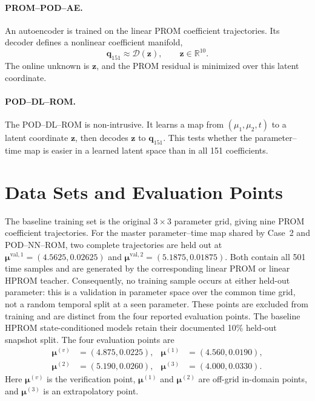 \documentclass[11pt]{article}
\newcommand{\q}{\mathbf q}
\newcommand{\mub}{\bm\mu}
\newcommand{\z}{\mathbf z}
\begin{document}
\paragraph{PROM--POD--AE.}
An autoencoder is trained on the linear PROM coefficient trajectories.  Its decoder defines a nonlinear coefficient
manifold,
\begin{equation}
  \q_{151}\approx\mathcal D(\z), \qquad \z\in\mathbb R^{10}.
  \label{eq:podae}
\end{equation}
The online unknown is \(\z\), and the PROM residual is minimized over this latent coordinate.

\paragraph{POD--DL--ROM.}
The POD--DL--ROM is non-intrusive.  It learns a map from \((\mu_1,\mu_2,t)\) to a latent coordinate \(\z\), then
decodes \(\z\) to \(\q_{151}\).  This tests whether the parameter--time map is easier in a learned latent space
than in all 151 coefficients.

\section{Data Sets and Evaluation Points}
The baseline training set is the original \(3\times3\) parameter grid, giving nine PROM coefficient trajectories.
For the master parameter--time map shared by Case~2 and POD--NN--ROM, two complete trajectories are held out at
\(\mub^{\mathrm{val},1}=(4.5625,0.02625)\) and
\(\mub^{\mathrm{val},2}=(5.1875,0.01875)\).  Both contain all 501 time samples and are generated by the
corresponding linear PROM or linear HPROM teacher.  Consequently, no training sample occurs at either held-out
parameter: this is a validation in parameter space over the common time grid, not a random temporal split at a
seen parameter.  These points are excluded from training and are distinct from the four reported evaluation points.
The baseline HPROM state-conditioned models retain their documented 10\% held-out snapshot split.  The four
evaluation points are
\begin{align*}
  \mub^{(v)} &= (4.875,0.0225), &
  \mub^{(1)} &= (4.560,0.0190),\\
  \mub^{(2)} &= (5.190,0.0260), &
  \mub^{(3)} &= (4.000,0.0330).
\end{align*}
Here \(\mub^{(v)}\) is the verification point, \(\mub^{(1)}\) and \(\mub^{(2)}\) are off-grid in-domain points, and
\(\mub^{(3)}\) is an extrapolatory point.
\end{document}
